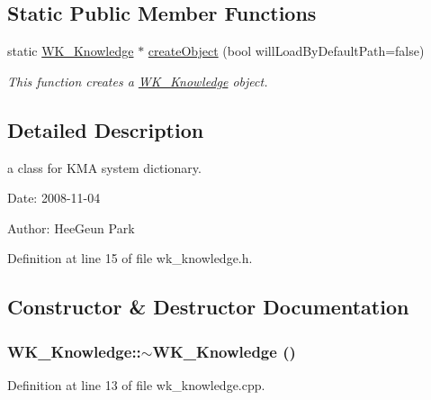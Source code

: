 \subsection*{Static Public Member Functions}
\begin{CompactItemize}
\item 
static \hyperlink{classWK__Knowledge}{WK\_\-Knowledge} $\ast$ \hyperlink{classWK__Knowledge_63c8fd907321f33da86df178f2c6e839}{createObject} (bool willLoadByDefaultPath=false)
\begin{CompactList}\small\item\em This function creates a \hyperlink{classWK__Knowledge}{WK\_\-Knowledge} object. \item\end{CompactList}\end{CompactItemize}


\subsection{Detailed Description}
a class for KMA system dictionary. 

\begin{Desc}
\item[Date:]2008-11-04 \end{Desc}
\begin{Desc}
\item[Author:]HeeGeun Park \end{Desc}


Definition at line 15 of file wk\_\-knowledge.h.

\subsection{Constructor \& Destructor Documentation}
\hypertarget{classWK__Knowledge_fc9a3d81b7755e64aba7ba4d48494457}{
\subsubsection[{$\sim$WK\_\-Knowledge}]{\setlength{\rightskip}{0pt plus 5cm}WK\_\-Knowledge::$\sim$WK\_\-Knowledge ()}}
\label{classWK__Knowledge_fc9a3d81b7755e64aba7ba4d48494457}




Definition at line 13 of file wk\_\-knowledge.cpp.

